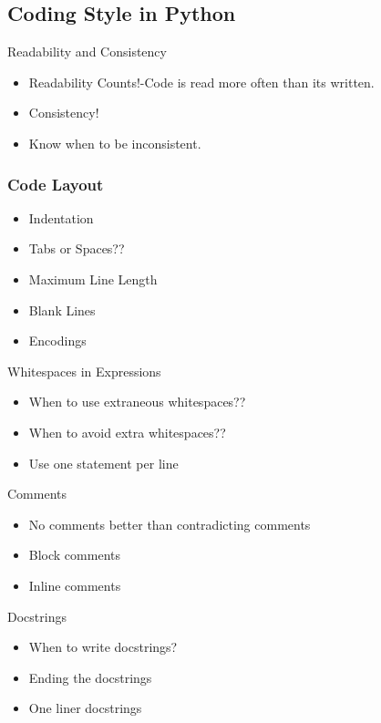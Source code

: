 \documentclass[14pt,compress]{beamer}
\newcounter{time}
\newcommand{\inctime}[1]{\addtocounter{time}{#1}{\tiny \thetime\ m}}
\begin{document}
\subsection{Coding Style in Python}
\begin{frame}{Readability and Consistency}
    \begin{itemize}
        \item Readability Counts!-Code is read more often than its written.
        \item Consistency!
        \item Know when to be inconsistent.
      \end{itemize}
\end{frame}

\begin{frame}[fragile]
  \frametitle{Code Layout}
  \begin{itemize}
        \item Indentation
        \item Tabs or Spaces??
        \item Maximum Line Length
        \item Blank Lines
        \item Encodings
   \end{itemize}
\end{frame}

\begin{frame}{Whitespaces in Expressions}
  \begin{itemize}
        \item When to use extraneous whitespaces??
        \item When to avoid extra whitespaces??
        \item Use one statement per line
   \end{itemize}
\end{frame}

\begin{frame}{Comments}
  \begin{itemize}
        \item No comments better than contradicting comments
        \item Block comments
        \item Inline comments
   \end{itemize}
\end{frame}

\begin{frame}{Docstrings}
  \begin{itemize}
        \item When to write docstrings?
        \item Ending the docstrings
        \item One liner docstrings
   \end{itemize}
\end{frame}
\inctime{10}
\end{document}
